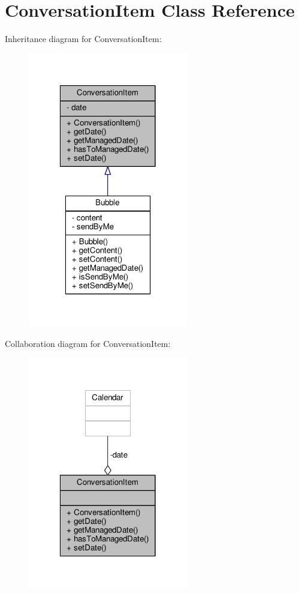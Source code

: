 \hypertarget{a00008}{\section{Conversation\+Item Class Reference}
\label{a00008}
}


Inheritance diagram for Conversation\+Item\+:
\nopagebreak
\begin{figure}[H]
\begin{center}
\leavevmode
\includegraphics[width=198pt]{a00058}
\end{center}
\end{figure}


Collaboration diagram for Conversation\+Item\+:
\nopagebreak
\begin{figure}[H]
\begin{center}
\leavevmode
\includegraphics[width=198pt]{a00059}
\end{center}
\end{figure}
